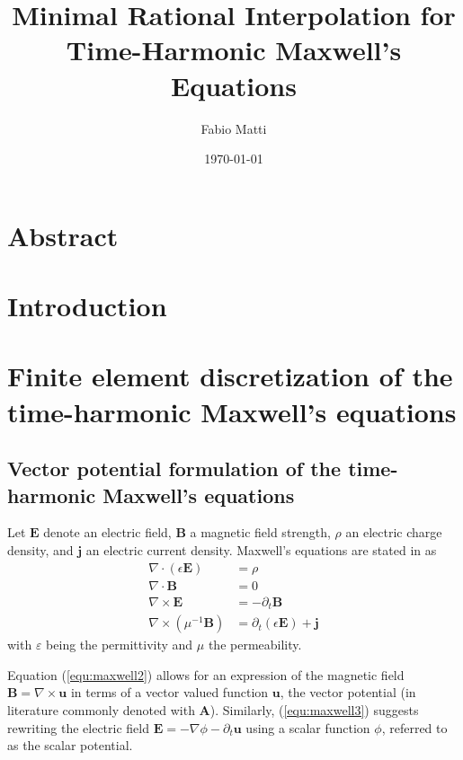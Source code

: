 \documentclass[11pt, a4paper]{article}
\title{Minimal Rational Interpolation for Time-Harmonic Maxwell's Equations}
\author{Fabio Matti}
\date{\today}
\begin{document}
\maketitle

\section*{Abstract}
\label{sec:abstract}

\pagebreak
\tableofcontents

\pagebreak
\section{Introduction}
\label{sec:introduction}

\pagebreak
\section{Finite element discretization of the time-harmonic Maxwell's equations}
\label{sec:maxwell}

\subsection{Vector potential formulation of the time-harmonic Maxwell's equations}
\label{subsec:maxwell-potential}
\the\textwidth


Let $\mathbf{E}$ denote an electric field, $\mathbf{B}$ a magnetic field
strength, $\rho$ an electric charge density, and $\mathbf{j}$ an electric
current density. Maxwell's equations are stated in \citep{monk} as
\begin{align}
    \nabla \cdot (\epsilon \mathbf{E}) &= \rho \label{equ:maxwell1} \\
    \nabla \cdot \mathbf{B} &= 0 \label{equ:maxwell2} \\
    \nabla \times \mathbf{E} &= -\partial_t \mathbf{B} \label{equ:maxwell3} \\
    \nabla \times (\mu^{-1} \mathbf{B}) &= \partial_t (\epsilon \mathbf{E}) + \mathbf{j} \label{equ:maxwell4}
\end{align}
with $\varepsilon$ being the permittivity and $\mu$ the permeability.


Equation (\ref{equ:maxwell2}) allows for an expression of the magnetic field 
$\mathbf{B} = \nabla \times \mathbf{u}$ in terms of a vector valued function
$\mathbf{u}$, the vector potential (in literature commonly denoted with
$\mathbf{A}$). Similarly, (\ref{equ:maxwell3}) suggests
rewriting the electric field $\mathbf{E} = - \nabla \phi - \partial_t \mathbf{u}$
using a scalar function $\phi$, referred to as the scalar potential.
\end{document}
